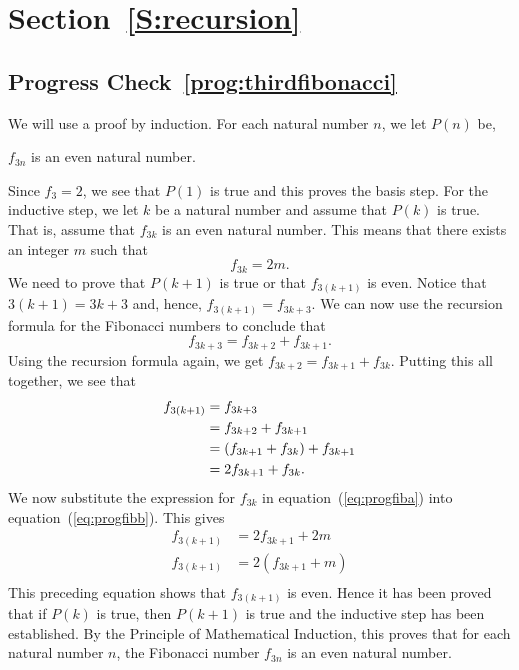 \section*{Section~\ref{S:recursion}}

\subsection*{Progress Check~\ref{prog:thirdfibonacci}}
\setcounter{equation}{0}
\begin{myproof}
We will use a proof by induction.  For each  natural number  $n$,  we let  $P( n )$
 be,
\begin{center}
$f_{3n} $  is an even natural number.
\end{center}

\noindent
Since  $f_3  = 2$, we see that  $P( 1 )$  is true and this proves the basis step.
\vskip6pt
\noindent
For the inductive step, we let  $k$  be a natural number and assume that  $P( k )$
 is true.  That is, assume that
$f_{3k} $  is an even natural number.
This means that there exists an integer  $m$  such that 
\begin{equation} \label{eq:progfiba}
f_{3k}  = 2m.
\end{equation}
We need to prove that  $P( {k + 1} )$ is true or that  $f_{3\left( {k + 1} \right)} $
 is even.  Notice that  $3( {k + 1} ) = 3k + 3$ and, hence,  
$f_{3\left( {k + 1} \right)}  = f_{3k + 3} $.  We can now use the recursion formula for the Fibonacci numbers to conclude that  
\[
f_{3k + 3}  = f_{3k + 2}  + f_{3k + 1} .
\]
Using the recursion formula again, we get $f_{3k + 2}  = f_{3k + 1}  + f_{3k}$.
Putting this all together, we see that
\begin{align}
  f_{3\left( {k + 1} \right)}  &= f_{3k + 3}  \notag \\ 
                               &= f_{3k + 2}  + f_{3k + 1}  \notag \\ 
                               &= \left( {f_{3k + 1}  + f_{3k} } \right) + f_{3k + 1}   \notag \\ 
                               &= 2f_{3k + 1}  + f_{3k}.  \label{eq:progfibb}
\end{align} 
We now substitute the expression for  $f_{3k} $ in equation~(\ref{eq:progfiba}) into 
equation~(\ref{eq:progfibb}).  This gives
\[
\begin{aligned}
  f_{3\left( {k + 1} \right)}  &= 2f_{3k + 1}  + 2m \\ 
  f_{3\left( {k + 1} \right)}  &= 2\left( {f_{3k + 1}  + m} \right) \\ 
\end{aligned} 
\]
This preceding equation shows that  $f_{3\left( {k + 1} \right)} $ is even.  Hence it has been proved that if  $P\left( k \right)$ is true, then $P\left( {k + 1} \right)$ is true and the inductive step has been established.  By the Principle of Mathematical Induction, this proves that  for each natural number  $n$,  the Fibonacci number  $f_{3n} $ is an even natural number.
\end{myproof}
\hbreak


\endinput
